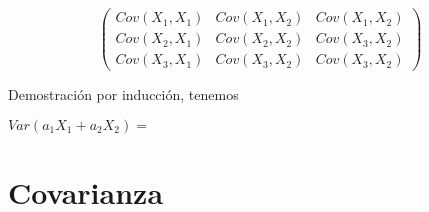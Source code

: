 \documentclass{book}
\begin{document}
$$
\begin{pmatrix}
Cov(X_1, X_1) & Cov(X_1,X_2) & Cov(X_1,X_2)  \\
Cov(X_2, X_1) & Cov(X_2,X_2) & Cov(X_3,X_2)  \\
Cov(X_3, X_1) & Cov(X_3,X_2) & Cov(X_3,X_2)   
\end{pmatrix}
$$

Demostración por inducción, tenemos 

$Var(a_1X_1+a_2X_2)=$







\section{Covarianza}

 




\end{document}
